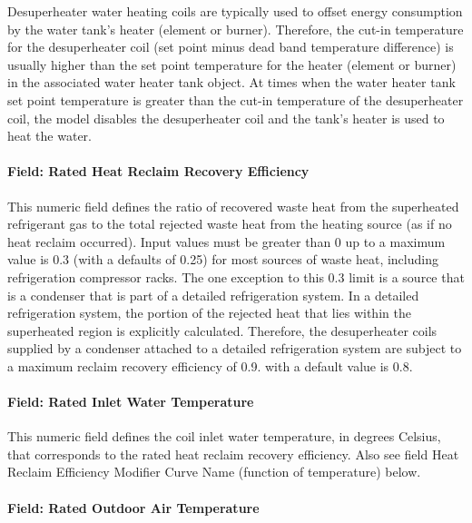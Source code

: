Desuperheater water heating coils are typically used to offset energy consumption by the water tank's heater (element or burner). Therefore, the cut-in temperature for the desuperheater coil (set point minus dead band temperature difference) is usually higher than the set point temperature for the heater (element or burner) in the associated water heater tank object. At times when the water heater tank set point temperature is greater than the cut-in temperature of the desuperheater coil, the model disables the desuperheater coil and the tank's heater is used to heat the water.

\paragraph{Field: Rated Heat Reclaim Recovery Efficiency}\label{field-rated-heat-reclaim-recovery-efficiency}

This numeric field defines the ratio of recovered waste heat from the superheated refrigerant gas to the total rejected waste heat from the heating source (as if no heat reclaim occurred). Input values must be greater than 0 up to a maximum value is 0.3 (with a defaults of 0.25) for most sources of waste heat, including refrigeration compressor racks. The one exception to this 0.3 limit is a source that is a condenser that is part of a detailed refrigeration system. In a detailed refrigeration system, the portion of the rejected heat that lies within the superheated region is explicitly calculated. Therefore, the desuperheater coils supplied by a condenser attached to a detailed refrigeration system are subject to a maximum reclaim recovery efficiency of 0.9. with a default value is 0.8.

\paragraph{Field: Rated Inlet Water Temperature}\label{field-rated-inlet-water-temperature-1}

This numeric field defines the coil inlet water temperature, in degrees Celsius, that corresponds to the rated heat reclaim recovery efficiency. Also see field Heat Reclaim Efficiency Modifier Curve Name (function of temperature) below.

\paragraph{Field: Rated Outdoor Air Temperature}\label{field-rated-outdoor-air-temperature}

